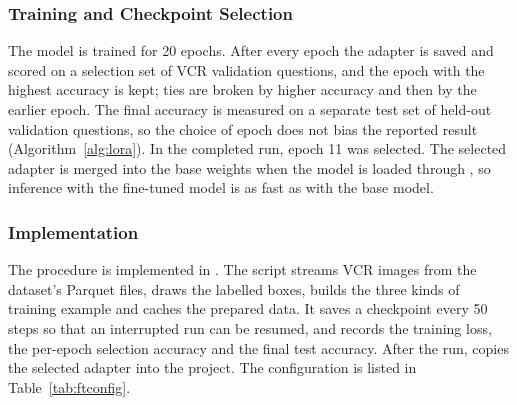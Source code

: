 \subsubsection{Training and Checkpoint Selection}
The model is trained for 20 epochs. After every epoch the adapter is saved and scored on a selection set of VCR validation questions, and the epoch with the highest \QtoAR{} accuracy is kept; ties are broken by higher \QtoA{} accuracy and then by the earlier epoch. The final accuracy is measured on a separate test set of held-out validation questions, so the choice of epoch does not bias the reported result (Algorithm~\ref{alg:lora}). In the completed run, epoch 11 was selected. The selected adapter is merged into the base weights when the model is loaded through , so inference with the fine-tuned model is as fast as with the base model.

\subsubsection{Implementation}
The procedure is implemented in . The script streams VCR images from the dataset's Parquet files, draws the labelled boxes, builds the three kinds of training example and caches the prepared data. It saves a checkpoint every 50 steps so that an interrupted run can be resumed, and records the training loss, the per-epoch selection accuracy and the final test accuracy. After the run,  copies the selected adapter into the project. The configuration is listed in Table~\ref{tab:ftconfig}.

